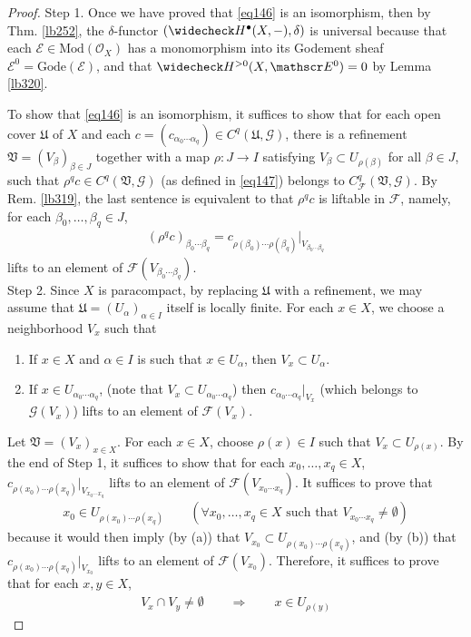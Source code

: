\documentclass[12pt,b5paper,notitlepage]{report}
\theoremstyle{definition}
\theoremstyle{plain}
\newcommand{\fk}{\mathfrak}
\newcommand{\wch}{\widecheck}
\newcommand{\scr}{\mathscr}
\newcommand{\blt}{\bullet}
\newcommand{\Mod}{\mathrm{Mod}}
\newcommand{\Gode}{\mathrm{Gode}}
\numberwithin{equation}{section}
\begin{document}
\begin{proof}
Step 1. Once we have proved that \eqref{eq146} is an isomorphism, then by Thm. \ref{lb252}, the $\delta$-functor $(\wch H^\blt(X,-),\delta)$ is universal because that each $\scr E\in\Mod(\scr O_X)$ has a monomorphism into its Godement sheaf $\scr E^0=\Gode(\scr E)$, and that $\wch H^{>0}(X,\scr E^0)=0$ by Lemma \ref{lb320}.





To show that \eqref{eq146} is an isomorphism, it suffices to show that for each open cover $\fk U$ of $X$ and each $c=(c_{\alpha_0\cdots\alpha_q})\in C^q(\fk U,\scr G)$, there is a refinement $\fk V=(V_\beta)_{\beta\in J}$ together with a map $\rho:J\rightarrow I$ satisfying $V_\beta\subset U_{\rho(\beta)}$ for all $\beta\in J$, such that  $\rho^qc\in C^q(\fk V,\scr G)$ (as defined in \eqref{eq147}) belongs to $C^q_{\scr F}(\fk V,\scr G)$. By Rem. \ref{lb319}, the last sentence is equivalent to that $\rho^qc$ is liftable in $\scr F$, namely, for each $\beta_0,\dots,\beta_q\in J$, 
\begin{align*}
(\rho^qc)_{\beta_0\cdots\beta_q}=c_{\rho(\beta_0)\cdots\rho(\beta_q)}|_{V_{\beta_0\cdots\beta_q}}
\end{align*}
lifts to an element of $\scr F(V_{\beta_0\cdots\beta_q})$.\\


Step 2. Since $X$ is paracompact, by replacing $\fk U$ with a refinement, we may assume that $\fk U=(U_\alpha)_{\alpha\in I}$ itself is locally finite. For each $x\in X$, we choose a neighborhood $V_x$ such that
\begin{enumerate}[label=(\alph*)]
\item If $x\in X$ and $\alpha\in I$ is such that $x\in U_\alpha$, then $V_x\subset U_\alpha$.
\item If $x\in U_{\alpha_0\cdots\alpha_q}$, (note that $V_x\subset U_{\alpha_0\cdots\alpha_q}$) then $c_{\alpha_0\cdots\alpha_q}|_{V_x}$ (which belongs to $\scr G(V_x)$) lifts to an element of $\scr F(V_x)$.
\end{enumerate}


Let $\fk V=(V_x)_{x\in X}$. For each $x\in X$, choose $\rho(x)\in I$ such that $V_x\subset U_{\rho(x)}$. By the end of Step 1, it suffices to show that for each $x_0,\dots,x_q\in X$, $c_{\rho(x_0)\cdots\rho(x_q)}|_{V_{x_0\cdots x_q}}$ lifts to an element of $\scr F(V_{x_0\cdots x_q})$. It suffices to prove that
\begin{align*}
x_0\in U_{\rho(x_0)\cdots\rho(x_q)}\qquad (\forall x_0,\dots,x_q\in X\text{ such that }V_{x_0\cdots x_q}\neq\emptyset)
\end{align*}
because it would then imply (by (a)) that $V_{x_0}\subset U_{\rho(x_0)\cdots\rho(x_q)}$, and (by (b)) that $c_{\rho(x_0)\cdots\rho(x_q)}|_{V_{x_0}}$ lifts to an element of $\scr F(V_{x_0})$. Therefore, it suffices to prove that for each $x,y\in X$,
\begin{align}
V_x\cap V_y\neq\emptyset\qquad\Longrightarrow \qquad x\in U_{\rho(y)} \label{eq148}
\end{align}


\end{proof}
\end{document}
